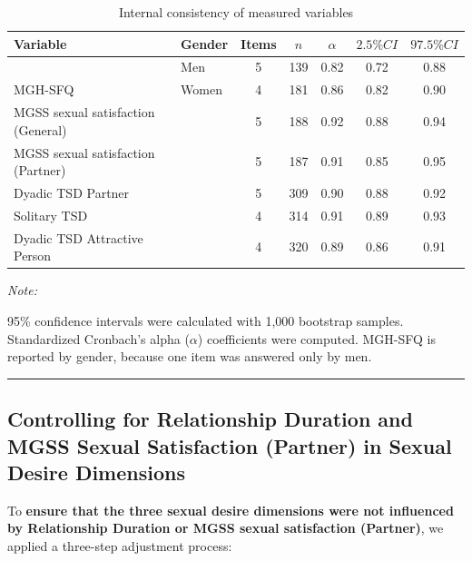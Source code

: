 \documentclass[
  bookmarksnumbered]{article}
\begin{document}
\begin{table}[H]
\centering
\caption{\label{tab:Cronbach-tab}Internal consistency of measured variables}
\centering
\begin{threeparttable}
\begin{tabular}[t]{llccccc}
\toprule
Variable & Gender & Items & $n$ & $\alpha$ & $2.5\% CI$ & $97.5\% CI$\\
\midrule
 & Men & 5 & 139 & 0.82 & 0.72 & 0.88\\
\cmidrule{2-7}
\multirow{-2}{*}{\raggedright\arraybackslash MGH-SFQ} & Women & 4 & 181 & 0.86 & 0.82 & 0.90\\
\cmidrule{1-7}
MGSS sexual satisfaction (General) &  & 5 & 188 & 0.92 & 0.88 & 0.94\\
\cmidrule{1-7}
MGSS sexual satisfaction (Partner) &  & 5 & 187 & 0.91 & 0.85 & 0.95\\
\cmidrule{1-7}
Dyadic TSD Partner &  & 5 & 309 & 0.90 & 0.88 & 0.92\\
\cmidrule{1-7}
Solitary TSD &  & 4 & 314 & 0.91 & 0.89 & 0.93\\
\cmidrule{1-7}
Dyadic TSD Attractive Person &  & 4 & 320 & 0.89 & 0.86 & 0.91\\
\bottomrule
\end{tabular}
\begin{tablenotes}[para]
\item \textit{Note: } 
\item 95\% confidence intervals were calculated with 1,000 bootstrap samples.
           Standardized Cronbach's alpha ($\alpha$) coefficients were computed.
           MGH-SFQ is reported by gender, because one item was answered only by men.
\end{tablenotes}
\end{threeparttable}
\end{table}

\begin{center}\rule{0.5\linewidth}{0.5pt}\end{center}

\subsection{Controlling for Relationship Duration and MGSS Sexual Satisfaction (Partner) in Sexual Desire Dimensions}\label{controlling-for-relationship-duration-and-mgss-sexual-satisfaction-partner-in-sexual-desire-dimensions}

To \textbf{ensure that the three sexual desire dimensions were not influenced by Relationship Duration or MGSS sexual satisfaction (Partner)}, we applied a three-step adjustment process:
\end{document}
